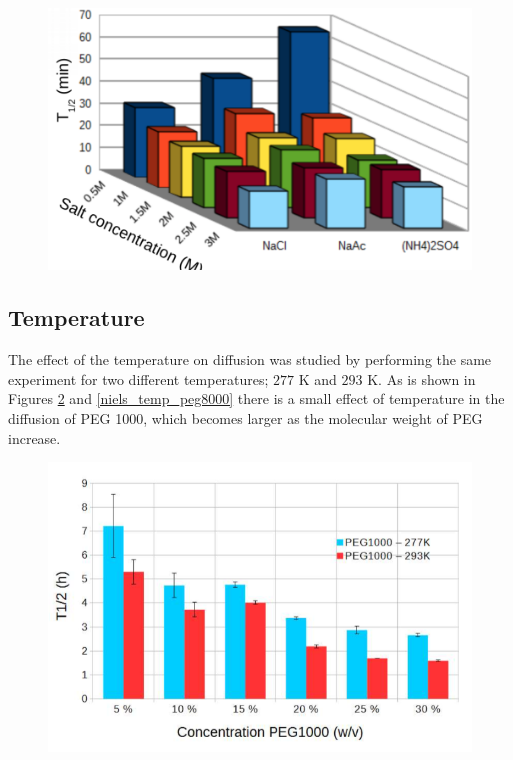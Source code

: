 \documentclass[11ptm,oneside,a4paper]{report}
\begin{document}
\begin{figure}[!htb]
  \begin{center}
      \includegraphics[scale=0.4]{figures/Niels-placeholder-SALTS-concentrations.png}
      \caption{\label{niels_salt_conc}}  
  \end{center} 
\end{figure}

\subsection*{Temperature}

The effect of the temperature on diffusion 
was studied by performing the same experiment for two different 
temperatures; $277$ K and $293$ K. As is shown in Figures \ref{niels_temp_peg} and 
\ref{niels_temp_peg8000} there is a small effect of temperature in the diffusion of 
PEG 1000, which becomes larger as the molecular weight of PEG increase. 
 
\begin{figure}[!htb]
  \begin{center}
      \includegraphics[scale=0.5]{figures/Niels-temperature-PEG1000.png}
      \caption{\label{niels_temp_peg}}  
  \end{center} 
\end{figure}
\end{document}
